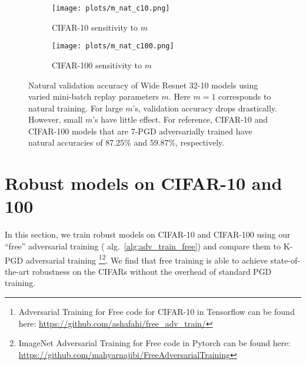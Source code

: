 \documentclass{article}
\begin{document}
\begin{figure}
    \centering
    \begin{subfigure}{0.40\textwidth}
        \texttt{[image: plots/m\_nat\_c10.png]}
        \caption{CIFAR-10 sensitivity to $m$}
        \label{fig:c10_v_m}
    \end{subfigure}
        \begin{subfigure}{0.40\textwidth}
        \texttt{[image: plots/m\_nat\_c100.png]}
        \caption{CIFAR-100 sensitivity to $m$}
        \label{fig:c100_v_m}    
    \end{subfigure}
    \caption{Natural validation accuracy of Wide Resnet 32-10 models using varied mini-batch replay parameters $m$. Here $m=1$ corresponds to natural training. For large $m$'s, validation accuracy drops drastically. However, small $m$'s have little effect. For reference, CIFAR-10 and CIFAR-100 models that are 7-PGD adversarially trained have natural accuracies of 87.25\% and 59.87\%, respectively.}
    \label{fig:cifars_m}
\end{figure}


\section{Robust models on CIFAR-10 and 100}
\label{sec:cifar}
In this section, we train robust models on CIFAR-10 and CIFAR-100 using our ``free'' adversarial training ( alg.~\ref{alg:adv_train_free}) and compare them to K-PGD adversarial training \footnote{Adversarial Training for Free code for CIFAR-10 in Tensorflow can be found here: \hyperlink{https://github.com/ashafahi/free_adv_train/}{\url{https://github.com/ashafahi/free_adv_train/}}}\footnote{ImageNet Adversarial Training for Free code in Pytorch can be found here: \hyperlink{https://github.com/mahyarnajibi/FreeAdversarialTraining}{\url{https://github.com/mahyarnajibi/FreeAdversarialTraining}}}.  We find that free training is able to achieve state-of-the-art robustness on the CIFARs without the overhead of standard PGD training.
\end{document}
